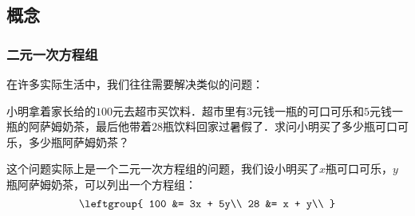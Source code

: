 
\subsection{概念}
\subsubsection{二元一次方程组}
在许多实际生活中，我们往往需要解决类似的问题：

小明拿着家长给的$100$元去超市买饮料．超市里有$3$元钱一瓶的可口可乐和$5$元钱一瓶的阿萨姆奶茶，最后他带着$28$瓶饮料回家过暑假了．求问小明买了多少瓶可口可乐，多少瓶阿萨姆奶茶？

这个问题实际上是一个二元一次方程组的问题，我们设小明买了$x$瓶可口可乐，$y$瓶阿萨姆奶茶，可以列出一个方程组：
\begin{equation}
\leftgroup{
100 &= 3x + 5y\\
28 &= x + y\\
}\end{equation}